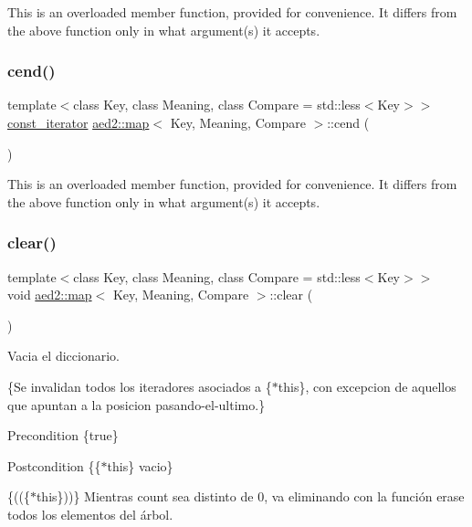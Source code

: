 This is an overloaded member function, provided for convenience. It differs from the above function only in what argument(s) it accepts. \mbox{\label{classaed2_1_1map_a7bb91e94cbc875f1a011b142ef877912}} 
\subsubsection{\texorpdfstring{cend()}{cend()}}
{\footnotesize\ttfamily template$<$class Key, class Meaning, class Compare = std\+::less$<$\+Key$>$$>$ \\
\hyperlink{classaed2_1_1map_1_1const__iterator}{const\+\_\+iterator} \hyperlink{classaed2_1_1map}{aed2\+::map}$<$ Key, Meaning, Compare $>$\+::cend (\begin{DoxyParamCaption}{ }\end{DoxyParamCaption})\hspace{0.3cm}{\ttfamily [inline]}}

This is an overloaded member function, provided for convenience. It differs from the above function only in what argument(s) it accepts. \mbox{\label{classaed2_1_1map_a2bfa5165825979bf2431db55bc6bc9ca}} 
\subsubsection{\texorpdfstring{clear()}{clear()}}
{\footnotesize\ttfamily template$<$class Key, class Meaning, class Compare = std\+::less$<$\+Key$>$$>$ \\
void \hyperlink{classaed2_1_1map}{aed2\+::map}$<$ Key, Meaning, Compare $>$\+::clear (\begin{DoxyParamCaption}{ }\end{DoxyParamCaption})\hspace{0.3cm}{\ttfamily [inline]}}



Vacia el diccionario. 

\{Se invalidan todos los iteradores asociados a \{$\ast$this\}, con excepcion de aquellos que apuntan a la posicion pasando-\/el-\/ultimo.\}

\begin{DoxyPrecond}{Precondition}
\{true\} 
\end{DoxyPrecond}
\begin{DoxyPostcond}{Postcondition}
\{\{$\ast$this\}  vacio\}
\end{DoxyPostcond}
\{((\{$\ast$this\}))\} Mientras count sea distinto de 0, va eliminando con la función erase todos los elementos del árbol. \mbox{\label{classaed2_1_1map_a6ad62765a2b2e00247b9e35a7542b448}} 
